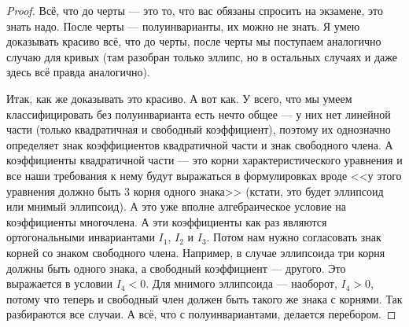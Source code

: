 \begin{proof}
    Всё, что до черты --- это то, что вас обязаны спросить на экзамене, это знать надо. После черты --- полуинварианты, их можно не знать. Я умею доказывать красиво всё, что до черты, после черты мы поступаем аналогично случаю для кривых (там разобран только эллипс, но в остальных случаях и даже здесь всё правда аналогично). 

    Итак, как же доказывать это красиво. А вот как. У всего, что мы умеем классифицировать без полуинварианта есть нечто общее --- у них нет линейной части (только квадратичная и свободный коэффициент), поэтому их однозначно определяет знак коэффициентов квадратичной части и знак свободного члена. А коэффициенты квадратичной части --- это корни характеристического уравнения и все наши требования к нему будут выражаться в формулировках вроде <<у этого уравнения должно быть 3 корня одного знака>> (кстати, это будет эллипсоид или мнимый эллипсоид). А это уже вполне алгебраическое условие на коэффициенты многочлена. А эти коэффициенты как раз являются ортогональными инвариантами $I_1$, $I_2$ и $I_3$. Потом нам нужно согласовать знак корней со знаком свободного члена. Например, в случае эллипсоида три корня должны быть одного знака, а свободный коэффициент --- другого. Это выражается в условии $I_4 < 0$. Для мнимого эллипсоида --- наоборот, $I_4 > 0$, потому что теперь и свободный член должен быть такого же знака с корнями. Так разбираются все случаи. А всё, что с полуинвариантами, делается перебором.
\end{proof}


